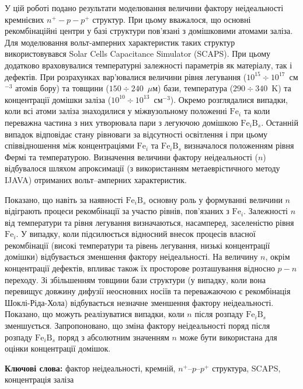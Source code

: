 ﻿\documentclass[12pt]{article}
\begin{document}
У цій роботі подано результати моделювання величини фактору не\-ідеально\-сті кремнієвих $n^+-p-p^+$ структур.
При цьому вважалося, що основні реком\-бі\-на\-цій\-ні центри у базі структури пов'язані з домішковими атомами заліза.
Для моде\-лю\-вання вольт-амперних характеристик таких структур використовувався Solar Cells Capacitance Simulator (SCAPS).
При цьому додатково враховувалися температурні залежності параметрів як матеріалу, так і дефектів.
При роз\-ра\-хун\-ках вар'ювалися величини рівня легування ($10^{15}\div10^{17}$~см$^{-3}$ атомів бору) та товщини ($150\div240$~$\mu$м) бази,
температура ($290\div340$~K) та концентрації домішки заліза ($10^{10}\div10^{13}$~см$^{-3}$).
Окремо розглядалися випадки, коли всі атоми заліза знаходилися у міжвузольному положенні $\mathrm{Fe}_i$ та
коли переважна частина з них утворювала пари з легуючою домішкою $\mathrm{Fe}_i\mathrm{B}_s$.
Останній випадок відповідає стану рівноваги за відсутності освітлення і при цьому
співвідношення між концентраціями  $\mathrm{Fe}_i$ та $\mathrm{Fe}_i\mathrm{B}_s$ визначалося положенням
рівня Фермі та тем\-пе\-ра\-ту\-рою.
Визначення величини фактору неідеальності ($n$) відбувалося шляхом апроксимації (з використанням
метаеврістичного методу IJAVA) отриманих во\-льт--ам\-пер\-них характеристик.

Показано, що навіть за наявності $\mathrm{Fe}_i\mathrm{B}_s$ основну роль у формуванні величини $n$
відіграють процеси рекомбінації за участю рівнів, пов'язаних з $\mathrm{Fe}_i$.
Залежності $n$ від температури та рівня легування визначаються, насамперед,
заселеністю рівня $\mathrm{Fe}_i$.
У випадку, коли підсилюється відносний внесок процесів власної рекомбінації (високі
температури та рівень легування, низькі концентрації до\-міш\-ки) відбувається зменшення фактору неідеальності.
На величину $n$, окрім концентрації дефектів, впливає також їх просторове розташування відносно $p-n$ переходу.
Зі збільшенням товщини бази структури (у випадку, коли вона перевищує довжину дифузії неосновних носіїв та
переважаючою є рекомбінація Шоклі-Ріда-Хола) відбувається незначне зменшення фактору неідеальності.
По\-ка\-за\-но, що можуть реалізуватися випадки, коли $n$ після розпаду $\mathrm{Fe}_i\mathrm{B}_s$ змен\-шуєть\-ся.
Запропоновано, що зміна фактору неідеальності поряд після розпаду $\mathrm{Fe}_i\mathrm{B}_s$ поряд з абсолютним значенням $n$  може бути використана
для оцінки концентрації домішок.


\textbf{Ключові слова:}
фактор неідеальності, кремній, $n^+$--$p$--$p^+$ структура, SCAPS, концентрація заліза
\end{document}
